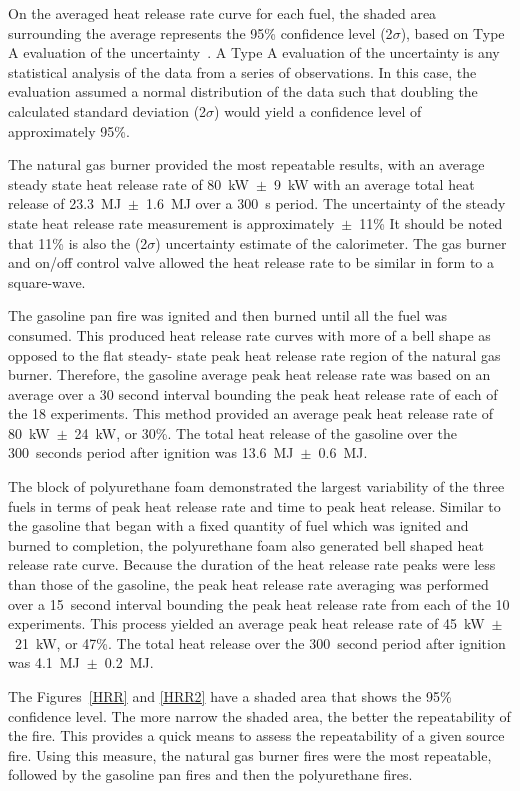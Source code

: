 \documentclass[twoside]{uocthesis}
\begin{document}
{On the averaged heat release rate curve for each fuel, the shaded area surrounding the average represents the 95\% confidence level (2$\sigma$), based on Type A evaluation of the uncertainty~\cite{Taylor:1994}.  A Type A evaluation of the uncertainty is any statistical analysis of the data from a series of observations.  In this case, the evaluation assumed a normal distribution of the data such that doubling the calculated standard deviation (2$\sigma$) would yield a confidence level of approximately 95\%.

The natural gas burner provided the most repeatable results, with an average steady state heat release rate of 80~kW~$\pm$~9~kW with an average total heat release of 23.3~MJ~$\pm$~1.6~MJ over a 300~s period. The uncertainty of the steady state heat release rate measurement is approximately~$\pm$~11\% It should be noted that 11\% is also the (2$\sigma$) uncertainty estimate of the calorimeter. The gas burner and on/off control valve allowed the heat release rate to be similar in form to a square-wave. 

The gasoline pan fire was ignited and then burned until all the fuel was consumed.  This produced heat release rate curves with more of a bell shape  as opposed to the flat steady- state peak heat release rate region of the natural gas burner.  Therefore, the  gasoline average peak heat release rate was based on an average over a 30 second interval bounding the peak heat release rate of each of the 18 experiments.  This method provided an average peak heat release rate of 80~kW~$\pm$~24~kW, or 30\%.  The total heat release of the gasoline over the 300~seconds period after ignition was 13.6~MJ~$\pm$~0.6~MJ.  

The block of polyurethane foam demonstrated the largest variability of the three fuels in terms of peak heat release rate and time to peak heat release. Similar to the gasoline that began with a fixed quantity of fuel which was ignited and burned to completion, the polyurethane foam also generated bell shaped heat release rate curve.  Because the duration of the heat release rate peaks were less than those of the gasoline, the peak heat release rate averaging was performed over a 15~second interval bounding the peak heat release rate from each of the 10 experiments.  This process yielded an average peak heat release rate of 45~kW~$\pm$~21~kW, or 47\%.  The total heat release over the 300~second period after ignition was 4.1~MJ~$\pm$~0.2~MJ. 

The Figures~\ref{HRR} and \ref{HRR2} have a shaded area that shows the 95\% confidence level.  The more narrow the shaded area, the better the repeatability of the fire.  This provides a quick means to assess the repeatability of a given source fire.  Using this measure, the natural gas burner fires were the most repeatable, followed by the gasoline pan fires and then the polyurethane fires.       


}
\end{document}
